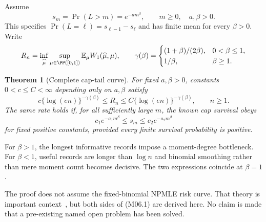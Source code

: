 \documentclass[11pt,a4paper]{article}
\newtheorem{theorem}{Theorem}[section]
\theoremstyle{definition}\newtheorem{definition}[theorem]{Definition}
\theoremstyle{remark}\newtheorem{remark}[theorem]{Remark}
\newcommand{\E}{\mathbb E}\newcommand{\one}{\mathbf 1}\newcommand{\1}{\mathbf 1}
\numberwithin{equation}{section}
\begin{document}
Assume
\[
 s_m=\Pr(L>m)=e^{-a m^\beta},\qquad m\ge0,\quad a,\beta>0.
\]
This specifies $\Pr(L=\ell)=s_{\ell-1}-s_\ell$ and has finite mean for every $\beta>0$. Write
\[
 R_n=\inf_{\widehat\mu}\sup_{\mu\in\PP([0,1])}\E_\mu W_1(\widehat\mu,\mu),
 \qquad
 \gamma(\beta)=\begin{cases}(1+\beta)/(2\beta),&0<\beta\le1,\\1/\beta,&\beta\ge1.\end{cases}
\]

\begin{theorem}[Complete cap-tail curve]\label{M06-th:main}
For fixed $a,\beta>0$, constants $0<c\le C<\infty$ depending only on $a,\beta$ satisfy
\[
 c\{\log(en)\}^{-\gamma(\beta)}
 \le R_n\le C\{\log(en)\}^{-\gamma(\beta)},\qquad n\ge1.
\tag{M06.1}
\]
The same rate holds if, for all sufficiently large $m$, the known cap survival obeys
\[
 c_1e^{-a_1m^\beta}\le s_m\le c_2e^{-a_2m^\beta}
\]
for fixed positive constants, provided every finite survival probability is positive.
\end{theorem}
For $\beta>1$, the longest informative records impose a moment-degree bottleneck. For $\beta<1$, useful records are longer than $\log n$ and binomial smoothing rather than mere moment count becomes decisive. The two expressions coincide at $\beta=1$.

The proof does not assume the fixed-binomial NPMLE risk curve. That theory is important context~\cite{ref014,ref015}, but both sides of (M06.1) are derived here. No claim is made that a pre-existing named open problem has been solved.
\end{document}
